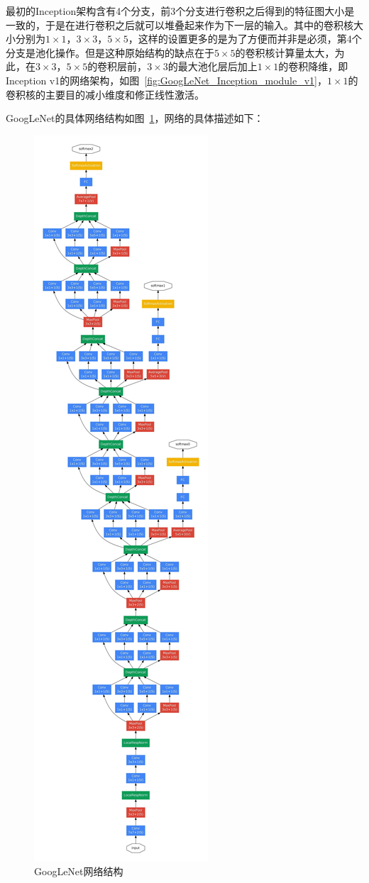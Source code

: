 最初的Inception架构含有4个分支，前3个分支进行卷积之后得到的特征图大小是一致的，于是在进行卷积之后就可以堆叠起来作为下一层的输入。其中的卷积核大小分别为$1\times1$，$3\times3$，$5\times5$，这样的设置更多的是为了方便而并非是必须，第4个分支是池化操作。但是这种原始结构的缺点在于$5\times5$的卷积核计算量太大，为此，在$3\times3$，$5\times5$的卷积层前，$3\times3$的最大池化层后加上$1\times1$的卷积降维，即Inception v1的网络架构，如图~\ref{fig:GoogLeNet_Inception_module_v1}，$1\times1$的卷积核的主要目的减小维度和修正线性激活。

GoogLeNet的具体网络结构如图~\ref{fig:GoogLeNet_net}，网络的具体描述如下：

\begin{figure}[htbp]
	\centering
	\includegraphics[width=0.4\linewidth]{readings_figures/GoogLeNet_net.jpeg}
	\caption{GoogLeNet网络结构}
	\label{fig:GoogLeNet_net}
\end{figure}


